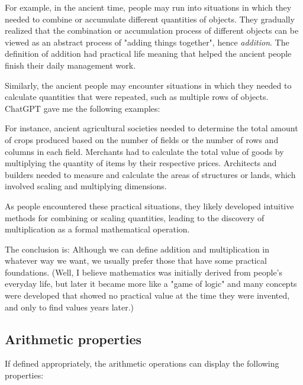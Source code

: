\documentclass[12pt, letterpaper, oneside]{book}
\begin{document}
For example, in the ancient time, people may run into situations in which they
needed to combine or accumulate different quantities of objects. They gradually
realized that the combination or accumulation process of different objects can
be viewed as an abstract process of "adding things together", hence \textit{
addition}. The definition of addition had practical life meaning that helped
the ancient people finish their daily management work.

Similarly, the ancient people may encounter situations in which they needed to
calculate quantities that were repeated, such as multiple rows of objects.
ChatGPT gave me the following examples:

\begin{displayquote}
  For instance, ancient agricultural societies needed to determine the total
  amount of crops produced based on the number of fields or the number of rows
  and columns in each field. Merchants had to calculate the total value of
  goods by multiplying the quantity of items by their respective prices.
  Architects and builders needed to measure and calculate the areas of
  structures or lands, which involved scaling and multiplying dimensions.

  As people encountered these practical situations, they likely developed
  intuitive methods for combining or scaling quantities, leading to the
  discovery of multiplication as a formal mathematical operation.
\end{displayquote}

The conclusion is: Although we can define addition and multiplication in
whatever way we want, we usually prefer those that have some practical
foundations. (Well, I believe mathematics was initially derived from people's
everyday life, but later it became more like a "game of logic" and many
concepts were developed that showed no practical value at the time they were
invented, and only to find values years later.)

\subsection{Arithmetic properties}

If defined appropriately, the arithmetic operations can display the following
properties:
\end{document}
